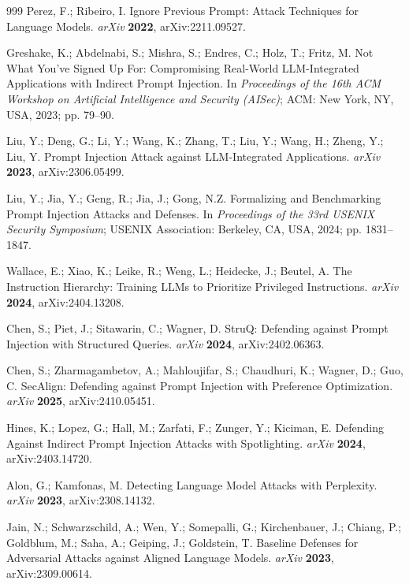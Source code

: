 \begin{thebibliography}{999}
Perez, F.; Ribeiro, I. Ignore Previous Prompt: Attack Techniques for Language Models.
\textit{arXiv} \textbf{2022}, arXiv:2211.09527.

Greshake, K.; Abdelnabi, S.; Mishra, S.; Endres, C.; Holz, T.; Fritz, M. Not What You've Signed
Up For: Compromising Real-World LLM-Integrated Applications with Indirect Prompt Injection. In
\textit{Proceedings of the 16th ACM Workshop on Artificial Intelligence and Security (AISec)};
ACM: New York, NY, USA, 2023; pp. 79--90.

Liu, Y.; Deng, G.; Li, Y.; Wang, K.; Zhang, T.; Liu, Y.; Wang, H.; Zheng, Y.; Liu, Y. Prompt
Injection Attack against LLM-Integrated Applications. \textit{arXiv} \textbf{2023},
arXiv:2306.05499.

Liu, Y.; Jia, Y.; Geng, R.; Jia, J.; Gong, N.Z. Formalizing and Benchmarking Prompt Injection
Attacks and Defenses. In \textit{Proceedings of the 33rd USENIX Security Symposium}; USENIX
Association: Berkeley, CA, USA, 2024; pp. 1831--1847.

Wallace, E.; Xiao, K.; Leike, R.; Weng, L.; Heidecke, J.; Beutel, A. The Instruction Hierarchy:
Training LLMs to Prioritize Privileged Instructions. \textit{arXiv} \textbf{2024},
arXiv:2404.13208.

Chen, S.; Piet, J.; Sitawarin, C.; Wagner, D. StruQ: Defending against Prompt Injection with
Structured Queries. \textit{arXiv} \textbf{2024}, arXiv:2402.06363.

Chen, S.; Zharmagambetov, A.; Mahloujifar, S.; Chaudhuri, K.; Wagner, D.; Guo, C. SecAlign:
Defending against Prompt Injection with Preference Optimization. \textit{arXiv} \textbf{2025},
arXiv:2410.05451.

Hines, K.; Lopez, G.; Hall, M.; Zarfati, F.; Zunger, Y.; Kiciman, E. Defending Against Indirect
Prompt Injection Attacks with Spotlighting. \textit{arXiv} \textbf{2024}, arXiv:2403.14720.

Alon, G.; Kamfonas, M. Detecting Language Model Attacks with Perplexity. \textit{arXiv}
\textbf{2023}, arXiv:2308.14132.

Jain, N.; Schwarzschild, A.; Wen, Y.; Somepalli, G.; Kirchenbauer, J.; Chiang, P.; Goldblum, M.;
Saha, A.; Geiping, J.; Goldstein, T. Baseline Defenses for Adversarial Attacks against Aligned
Language Models. \textit{arXiv} \textbf{2023}, arXiv:2309.00614.


\end{thebibliography}
